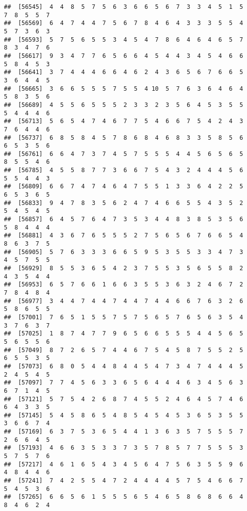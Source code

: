 \documentclass[
]{book}
\begin{document}
\begin{verbatim}
##  [56545]  4  4  8  5  7  5  6  3  6  6  5  6  7  3  3  4  5  1  5  7  8  5  5  7
##  [56569]  6  4  7  4  4  7  5  6  7  8  4  6  4  3  3  3  5  5  4  5  7  3  6  3
##  [56593]  5  7  5  6  5  5  3  4  5  4  7  8  6  4  6  4  6  5  7  8  3  4  7  6
##  [56617]  9  3  4  7  7  6  5  6  6  4  5  4  4  3  4  5  4  6  6  5  8  4  5  3
##  [56641]  3  7  4  4  4  6  6  4  6  2  4  3  6  5  6  7  6  6  5  3  6  4  4  5
##  [56665]  3  6  6  5  5  5  7  5  5  4 10  5  7  6  3  6  4  6  4  5  8  3  5  6
##  [56689]  4  5  5  6  5  5  5  2  3  3  2  3  5  6  4  5  3  5  5  5  4  4  4  6
##  [56713]  5  6  5  4  7  4  6  7  7  5  4  6  6  7  5  4  2  4  3  7  6  4  4  6
##  [56737]  6  8  5  8  4  5  7  8  6  8  4  6  8  3  3  5  8  5  6  6  5  3  5  6
##  [56761]  6  6  4  7  3  7  4  5  7  5  5  5  4  4  5  6  5  6  5  8  5  5  4  6
##  [56785]  4  5  5  8  7  7  3  6  6  7  5  4  3  2  4  4  4  5  6  5  5  4  4  3
##  [56809]  6  6  7  4  7  4  6  4  7  5  5  1  3  3  6  4  2  2  5  6  5  3  6  5
##  [56833]  9  4  7  8  3  5  6  2  4  7  4  6  6  5  5  4  3  5  2  5  4  5  4  5
##  [56857]  6  4  5  7  6  4  7  3  5  3  4  4  8  3  8  5  3  5  6  5  8  4  4  4
##  [56881]  4  3  6  7  6  5  5  5  2  7  5  6  5  6  7  6  6  5  4  8  6  3  7  5
##  [56905]  5  7  6  3  3  3  6  6  5  9  5  3  5  5  3  3  4  7  3  4  5  7  5  5
##  [56929]  8  5  5  3  6  5  4  2  3  7  5  5  3  5  6  5  5  8  2  4  3  5  4  4
##  [56953]  6  5  7  6  6  1  6  6  3  5  5  3  6  3  2  4  6  7  2  7  8  4  8  4
##  [56977]  3  4  4  7  4  4  7  4  4  7  4  4  6  6  7  6  3  2  6  5  8  6  5  5
##  [57001]  7  6  5  1  5  5  7  5  7  5  6  5  7  6  5  6  3  5  4  3  7  6  3  7
##  [57025]  1  8  7  4  7  7  9  6  5  6  6  5  5  5  4  4  5  6  5  5  6  5  5  6
##  [57049]  8  7  2  6  5  7  4  4  6  7  5  4  5  8  7  5  5  2  5  6  5  5  3  5
##  [57073]  6  8  0  5  4  4  8  4  4  5  4  7  3  4  7  4  4  4  5  2  4  5  4  5
##  [57097]  7  7  4  5  6  3  3  6  5  6  4  4  4  6  3  4  5  6  3  6  7  1  4  5
##  [57121]  5  7  5  4  2  6  8  7  4  5  5  2  4  6  4  5  7  4  6  6  4  3  3  5
##  [57145]  5  4  5  8  6  5  4  8  5  4  5  4  5  3  6  5  3  5  5  3  6  6  7  4
##  [57169]  6  3  7  5  3  6  5  4  4  1  3  6  3  5  7  5  5  5  7  2  6  6  4  5
##  [57193]  4  6  6  3  5  3  3  7  3  5  7  8  5  7  7  5  5  5  3  5  7  5  7  6
##  [57217]  4  6  1  6  5  4  3  4  5  6  4  7  5  6  3  5  5  9  6  4  8  4  4  6
##  [57241]  7  4  2  5  5  4  7  2  4  4  4  4  5  7  5  4  6  6  7  5  4  5  3  6
##  [57265]  6  6  5  6  1  5  5  5  6  5  4  6  5  8  6  8  6  6  4  8  4  6  2  4

\end{verbatim}
\end{document}
